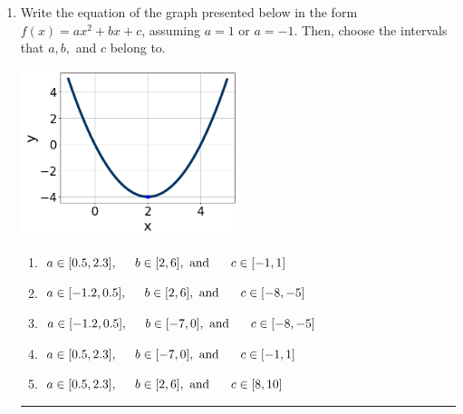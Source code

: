 \documentclass[14pt]{extbook}
\newcommand{\litem}[1]{\item#1\hspace*{-1cm}\rule{\textwidth}{0.4pt}}
\begin{document}
\begin{enumerate}
{\begin{enumerate}[label=\Alph*.]
\end{enumerate} }
\litem{
Write the equation of the graph presented below in the form $f(x)=ax^2+bx+c$, assuming  $a=1$ or $a=-1$. Then, choose the intervals that $a, b,$ and $c$ belong to.
\begin{center}
    \includegraphics[width=0.5\textwidth]{../Figures/quadraticGraphToEquationCopyC.png}
\end{center}
\begin{enumerate}[label=\Alph*.]
\item \( a \in [0.5, 2.3], \hspace*{5mm} b \in [2, 6], \text{ and } \hspace*{5mm} c \in [-1, 1] \)
\item \( a \in [-1.2, 0.5], \hspace*{5mm} b \in [2, 6], \text{ and } \hspace*{5mm} c \in [-8, -5] \)
\item \( a \in [-1.2, 0.5], \hspace*{5mm} b \in [-7, 0], \text{ and } \hspace*{5mm} c \in [-8, -5] \)
\item \( a \in [0.5, 2.3], \hspace*{5mm} b \in [-7, 0], \text{ and } \hspace*{5mm} c \in [-1, 1] \)
\item \( a \in [0.5, 2.3], \hspace*{5mm} b \in [2, 6], \text{ and } \hspace*{5mm} c \in [8, 10] \)

\end{enumerate} }
\end{enumerate}
\end{document}
